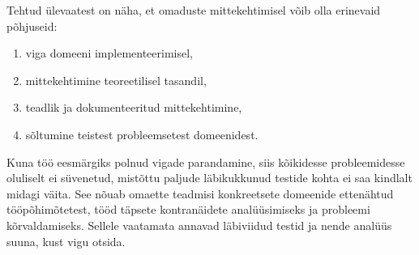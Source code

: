 \documentclass[../thesis.tex]{subfiles}
\begin{document}
Tehtud ülevaatest on näha, et omaduste mittekehtimisel võib olla erinevaid põhjuseid:
\begin{enumerate}[nosep]
	\item viga domeeni implementeerimisel,
	\item mittekehtimine teoreetilisel tasandil,
	\item teadlik ja dokumenteeritud mittekehtimine,
	\item sõltumine teistest probleemsetest domeenidest.
\end{enumerate}
Kuna töö eesmärgiks polnud vigade parandamine, siis kõikidesse probleemidesse oluliselt ei süvenetud, mistõttu paljude läbikukkunud testide kohta ei saa kindlalt midagi väita. See nõuab omaette teadmisi konkreetsete domeenide ettenähtud tööpõhimõtetest, tööd täpsete kontranäidete analüüsimiseks ja probleemi kõrvaldamiseks. Sellele vaatamata annavad läbiviidud testid ja nende analüüs suuna, kust vigu otsida.
\end{document}
